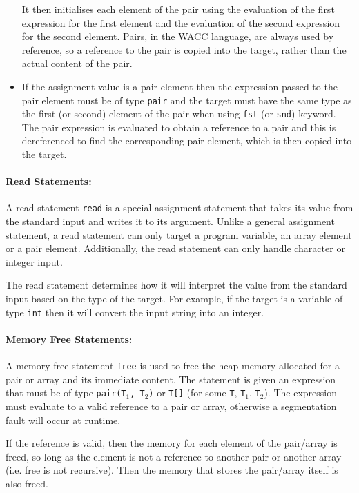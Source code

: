 \documentclass[a4paper]{article}
\theoremstyle{definition}
\begin{document}
\begin{itemize}
       It then initialises each element of the pair using the evaluation of the first expression for the first element
       and the evaluation of the second expression for the second element.
       Pairs, in the WACC language, are always used by reference, so a reference to the pair is copied into the target, rather than the actual content of the pair.
 \item If the assignment value is a pair element  then the expression passed to the pair element must be of type \texttt{pair}
       and the target must have the same type as the first (or second) element of the pair when using \texttt{fst} (or \texttt{snd}) keyword.
       The pair expression is evaluated to obtain a reference to a pair and this is dereferenced to find the corresponding pair element,
       which is then copied into the target.
 \end{itemize}

\paragraph{Read Statements:}
A read statement \texttt{read} is a special assignment statement that takes its value from the standard input and writes it to its argument.
Unlike a general assignment statement, a read statement can only target a program variable, an array element or a pair element.
Additionally, the read statement can only handle character or integer input.

The read statement determines how it will interpret the value from the standard input based on the type of the target.
For example, if the target is a variable of type \texttt{int} then it will convert the input string into an integer.

\paragraph{Memory Free Statements:}
A memory free statement \texttt{free} is used to free the heap memory allocated for a pair or array and its immediate content.
The statement is given an expression that must be of type \texttt{pair(T$_1$, T$_2$)} or \texttt{T[]} (for some {\tt T}, {\tt T}$_1$, {\tt T}$_2$).
The expression must evaluate to a valid reference to a pair or array, otherwise a segmentation fault will occur at runtime.

If the reference is valid, then the memory for each element of the pair/array is freed, so long as the element is not a reference to another pair or another array
(i.e. free is not recursive).
Then the memory that stores the pair/array itself is also freed.
\end{document}
